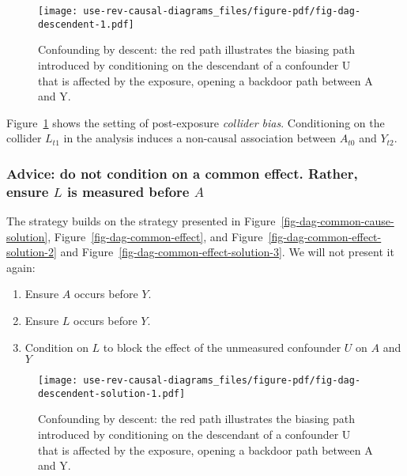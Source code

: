 \documentclass[
  singlecolumn,
  9pt]{article}
\providecommand{\tightlist}{%
  \setlength{\itemsep}{0pt}\setlength{\parskip}{0pt}}\usepackage{longtable,booktabs,array}
\begin{document}
\begin{figure}

{\centering \texttt{[image: use-rev-causal-diagrams\_files/figure-pdf/fig-dag-descendent-1.pdf]}

}

\caption{\label{fig-dag-descendent}Confounding by descent: the red path
illustrates the biasing path introduced by conditioning on the
descendant of a confounder U that is affected by the exposure, opening a
backdoor path between A and Y.}

\end{figure}

Figure~\ref{fig-dag-descendent} shows the setting of post-exposure
\emph{collider bias}. Conditioning on the collider \(L_{t1}\) in the
analysis induces a non-causal association between \(A_{t0}\) and
\(Y_{t2}\).

\subsubsection{\texorpdfstring{Advice: do not condition on a common
effect. Rather, ensure \(L\) is measured before
\(A\)}{Advice: do not condition on a common effect. Rather, ensure L is measured before A}}\label{advice-do-not-condition-on-a-common-effect.-rather-ensure-l-is-measured-before-a}

The strategy builds on the strategy presented in
Figure~\ref{fig-dag-common-cause-solution},
Figure~\ref{fig-dag-common-effect}, and
Figure~\ref{fig-dag-common-effect-solution-2} and
Figure~\ref{fig-dag-common-effect-solution-3}. We will not present it
again:

\begin{enumerate}
\def\labelenumi{\arabic{enumi}.}
\tightlist
\item
  Ensure \(A\) occurs before \(Y\).
\item
  Ensure \(L\) occurs before \(Y\).
\item
  Condition on \(L\) to block the effect of the unmeasured confounder
  \(U\) on \(A\) and \(Y\)
\end{enumerate}

\begin{figure}

{\centering \texttt{[image: use-rev-causal-diagrams\_files/figure-pdf/fig-dag-descendent-solution-1.pdf]}

}

\caption{\label{fig-dag-descendent-solution}Confounding by descent: the
red path illustrates the biasing path introduced by conditioning on the
descendant of a confounder U that is affected by the exposure, opening a
backdoor path between A and Y.}

\end{figure}
\end{document}
